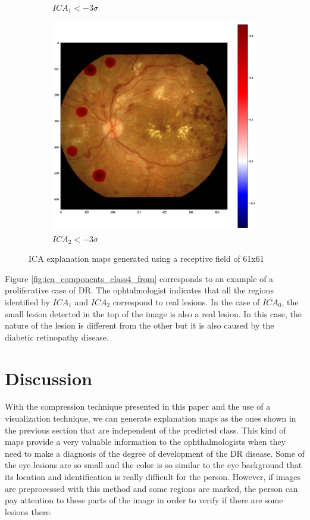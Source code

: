 \documentclass[review]{elsarticle}
\theoremstyle{definition} %
\theoremstyle{remark}
\begin{document}
\begin{figure}[h!]
\begin{subfigure}[b]{0.32\textwidth}
		\caption{$ICA_1 < - 3 \sigma$}	
	\end{subfigure}
	\begin{subfigure}[b]{0.32\textwidth}
		\centering
		\includegraphics[width=\textwidth]{./figures/ica_retine_maps/G3-P4/m22.png}
		\caption{$ICA_2 < - 3 \sigma$}	
	\end{subfigure}
	\hfill 
	\caption{ICA explanation maps generated using a receptive field of 61x61}  
	\label{fig:ica_components_class4} 
\end{figure}


Figure \ref{fig:ica_components_class4_from} corresponds to an example of a proliferative case of DR. The ophtalmologist indicates that all the regions identified by $ICA_1$ and $ICA_2$ correspond to real lesions. In the case of $ICA_0$, the small lesion detected in the top of the image is also a real lesion. In this case, the nature of the lesion is different from the other but it is also caused by the diabetic retinopathy disease.

\section{Discussion}\label{sec:discussion}


With the compression technique presented in this paper and the use of a visualization technique, we can generate explanation maps as the ones shown in the previous section that are independent of the predicted class. This kind of maps provide a very valuable information to the ophthalmologists when they need to make a diagnosis of the degree of development of the DR disease. Some of the eye lesions are so small and the color is so similar to the eye background that its location and identification is really difficult for the person. 
However, if images are preprocessed with this method and some regions are marked, the person can pay 
attention to these parts of the image in order to verify if there are some lesions there.
\end{document}
